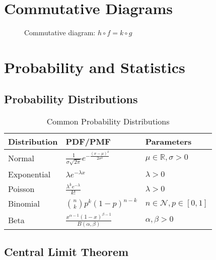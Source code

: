 \documentclass[11pt,a4paper]{article}
\theoremstyle{definition}
\newcommand{\R}{\mathbb{R}}
\newcommand{\N}{\mathcal{N}}
\begin{document}
\section{Commutative Diagrams}

\begin{figure}[H]
\centering
{}
\caption{Commutative diagram: $h \circ f = k \circ g$}
\label{fig:commutative}
\end{figure}

\section{Probability and Statistics}

\subsection{Probability Distributions}

\begin{table}[H]
\centering
\caption{Common Probability Distributions}
\label{tab:distributions}
\begin{tabular}{lll}
\toprule
\textbf{Distribution} & \textbf{PDF/PMF} & \textbf{Parameters} \\
\midrule
Normal & $\frac{1}{\sigma\sqrt{2\pi}}e^{-\frac{(x-\mu)^2}{2\sigma^2}}$ & $\mu \in \R, \sigma > 0$ \\[0.3cm]
Exponential & $\lambda e^{-\lambda x}$ & $\lambda > 0$ \\[0.3cm]
Poisson & $\frac{\lambda^k e^{-\lambda}}{k!}$ & $\lambda > 0$ \\[0.3cm]
Binomial & $\binom{n}{k}p^k(1-p)^{n-k}$ & $n \in \N, p \in [0,1]$ \\[0.3cm]
Beta & $\frac{x^{\alpha-1}(1-x)^{\beta-1}}{B(\alpha,\beta)}$ & $\alpha, \beta > 0$ \\
\bottomrule
\end{tabular}
\end{table}

\subsection{Central Limit Theorem}
\end{document}
